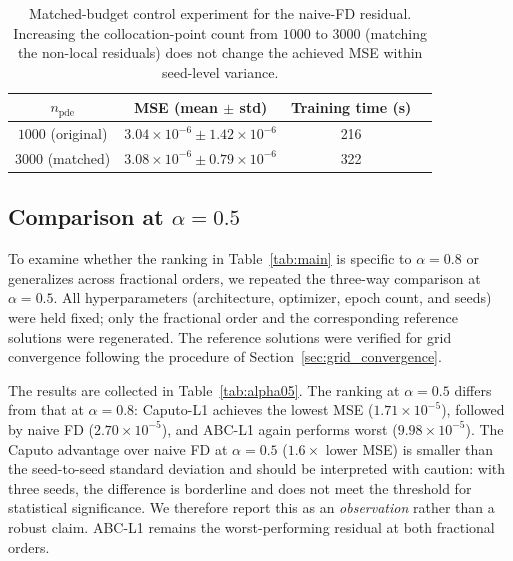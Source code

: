 \documentclass[11pt]{article}
\begin{document}
\begin{table}[h]
\centering
\caption{Matched-budget control experiment for the naive-FD residual.
         Increasing the collocation-point count from \(1000\) to
         \(3000\) (matching the non-local residuals) does not change
         the achieved MSE within seed-level variance.}
\label{tab:matched_budget}
\begin{tabular}{cccc}
\toprule
\(n_{\mathrm{pde}}\) & MSE (mean \(\pm\) std) & Training time (s) \\
\midrule
\(1000\) (original)     & \(3.04\times 10^{-6} \pm 1.42\times 10^{-6}\) & 216 \\
\(3000\) (matched)      & \(3.08\times 10^{-6} \pm 0.79\times 10^{-6}\) & 322 \\
\bottomrule
\end{tabular}
\end{table}

\subsection{Comparison at \(\alpha = 0.5\)}
\label{sec:alpha05}

To examine whether the ranking in Table~\ref{tab:main} is specific to
\(\alpha = 0.8\) or generalizes across fractional orders, we repeated
the three-way comparison at \(\alpha = 0.5\). All hyperparameters
(architecture, optimizer, epoch count, and seeds) were held fixed; only
the fractional order and the corresponding reference solutions were
regenerated. The reference solutions were verified for grid
convergence following the procedure of
Section~\ref{sec:grid_convergence}.

The results are collected in Table~\ref{tab:alpha05}. The ranking
at \(\alpha = 0.5\) differs from that at \(\alpha = 0.8\):
Caputo-L1 achieves the lowest MSE (\(1.71\times 10^{-5}\)),
followed by naive FD (\(2.70\times 10^{-5}\)), and ABC-L1 again
performs worst (\(9.98\times 10^{-5}\)). The Caputo advantage over
naive FD at \(\alpha=0.5\) (\(1.6\times\) lower MSE) is smaller than
the seed-to-seed standard deviation and should be interpreted with
caution: with three seeds, the difference is borderline and does not
meet the threshold for statistical significance. We therefore report
this as an \emph{observation} rather than a robust claim. ABC-L1
remains the worst-performing residual at both fractional orders.
\end{document}
